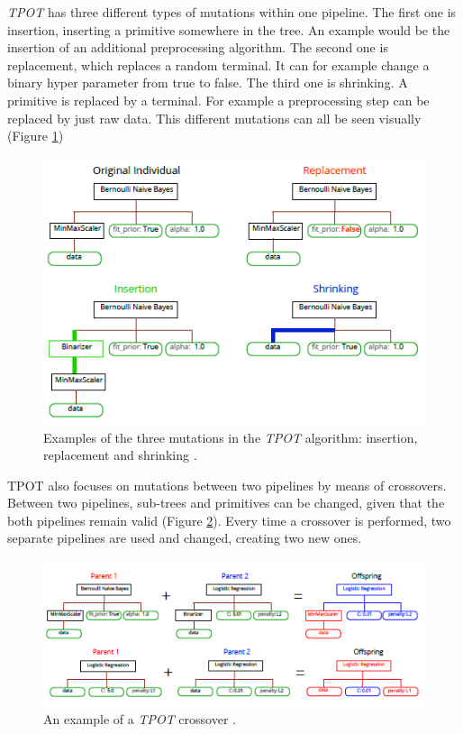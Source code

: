 \documentclass[10pt,a4paper]{report}
\begin{document}
	\textit{TPOT} has three different types of mutations within one pipeline. The first one is insertion, inserting a primitive somewhere in the tree. An example would be the insertion of an additional preprocessing algorithm. The second one is replacement, which replaces a random terminal. It can for example change a binary hyper parameter from true to false. The third one is shrinking. A primitive is replaced by a terminal. For example a preprocessing step can be replaced by just raw data. This different mutations can all be seen visually (Figure \ref{fig:TPOTMutations})
	
	\begin{figure}[h!]
		\includegraphics[scale=1]{TPOTMutations.png}
		\caption{Examples of the three mutations in the \textit{TPOT} algorithm: insertion, replacement and shrinking \cite{Gijsbers2017Thesis}.}
		\label{fig:TPOTMutations}
	\end{figure}
	
	TPOT also focuses on mutations between two pipelines by means of crossovers. Between two pipelines, sub-trees and primitives can be changed, given that the both pipelines remain valid (Figure \ref{fig:TPOTCrossover}). Every time a crossover is performed, two separate pipelines are used and changed, creating two new ones.
	
	\begin{figure}[h!]
		\includegraphics[scale=1]{TPOTCrossover.png}
		\caption{An example of a \textit{TPOT} crossover \cite{Gijsbers2017Thesis}.}
		\label{fig:TPOTCrossover}
	\end{figure}
	
\end{document}
